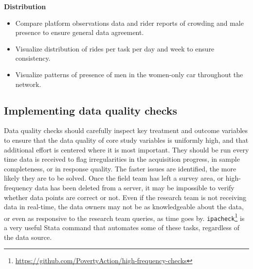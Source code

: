 \documentclass[
]{book}
\providecommand{\tightlist}{%
  \setlength{\itemsep}{0pt}\setlength{\parskip}{0pt}}
\begin{document}
\begin{ex}
\textbf{Distribution}

\begin{itemize}
\tightlist
\item
  Compare platform observations data and rider reports of crowding and male presence to ensure general data agreement.
\item
  Visualize distribution of rides per task per day and week to ensure consistency.
\item
  Visualize patterns of presence of men in the women-only car throughout the network.
\end{itemize}
\end{ex}

\hypertarget{implementing-data-quality-checks}{%
\subsection*{Implementing data quality checks}\label{implementing-data-quality-checks}}

Data quality checks should carefully inspect key treatment and outcome variables
to ensure that the data quality of core study variables is uniformly high,
and that additional effort is centered where it is most important.
They should be run every time data is received
to flag irregularities in the acquisition progress, in sample completeness, or in response quality.
The faster issues are identified, the more likely they are to be solved.
Once the field team has left a survey area,
or high-frequency data has been deleted from a server,
it may be impossible to verify whether data points are correct or not.
Even if the research team is not receiving data in real-time,
the data owners may not be as knowledgeable about the data,
or even as responsive to the research team queries, as time goes by.
\texttt{ipacheck}\footnote{\url{https://github.com/PovertyAction/high-frequency-checks}}
is a very useful Stata command that automates some of these tasks,
regardless of the data source.
\end{document}
